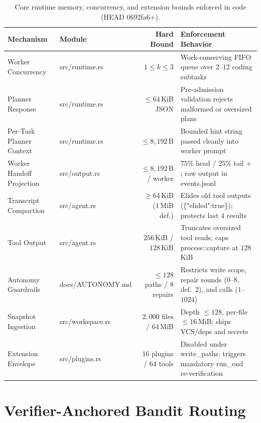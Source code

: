 \documentclass[10pt,letterpaper]{article}
\newcommand{\code}[1]{\textnormal{\small\ttfamily #1}}
\begin{document}
\begin{table}[htbp]
  \centering
  \small
  \caption{Core runtime memory, concurrency, and extension bounds enforced in code (\code{HEAD 0692fa6+}).}
  \label{tab:bounds}
  \begin{tabularx}{\textwidth}{@{}llrL@{}}
    \toprule
    \textbf{Mechanism} & \textbf{Module} & \textbf{Hard Bound} & \textbf{Enforcement Behavior} \\
    \midrule
    Worker Concurrency & \code{src/runtime.rs} & $1 \le k \le 3$ & Work-conserving FIFO queue over $2$--$12$ coding subtasks \\
    Planner Response & \code{src/runtime.rs} & $\le 64$\,KiB JSON & Pre-admission validation rejects malformed or oversized plans \\
    Per-Task Planner Context & \code{src/runtime.rs} & $\le 8{,}192$\,B & Bounded hint string passed cleanly into worker prompt \\
    Worker Handoff Projection & \code{src/output.rs} & $\le 8{,}192$\,B / worker & $75\%$ head / $25\%$ tail + \code{[zeus: middle omitted]}; raw output in \code{events.jsonl} \\
    Transcript Compaction & \code{src/agent.rs} & $\ge 64$\,KiB ($1$\,MiB def.) & Elides old tool outputs (\code{\{"elided":true\}}); protects last $4$ results \\
    Tool Output & \code{src/agent.rs} & $256$\,KiB / $128$\,KiB & Truncates oversized tool reads; caps \code{process::capture} at $128$\,KiB \\
    Autonomy Guardrails & \code{docs/AUTONOMY.md} & $\le 128$ paths / $8$ repairs & Restricts write scope, repair rounds ($0$--$8$, def.\ $2$), and calls ($1$--$1024$) \\
    Snapshot Ingestion & \code{src/workspace.rs} & $2{,}000$ files / $64$\,MiB & Depth $\le 128$, per-file $\le 16$\,MiB; skips VCS/deps and secrets \\
    Extension Envelope & \code{src/plugins.rs} & $16$ plugins / $64$ tools & Disabled under \code{write\_paths}; triggers mandatory \code{run\_end} re-verification \\
    \bottomrule
  \end{tabularx}
\end{table}

\section{Verifier-Anchored Bandit Routing}
\label{sec:routing}
\end{document}

